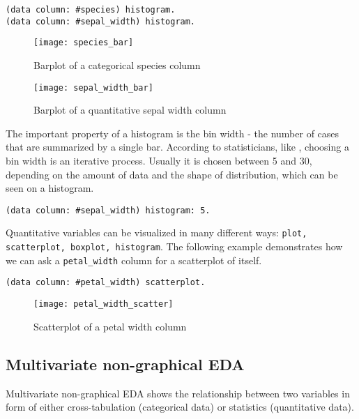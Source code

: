 \documentclass[sigplan]{acmart}
\begin{document}
\begin{lstlisting}[basicstyle=\small,language=Smalltalk]
(data column: #species) histogram.
(data column: #sepal_width) histogram.
\end{lstlisting}

\begin{figure}[H]
  \begin{center}
  \texttt{[image: species\_bar]}
  \caption{Barplot of a categorical species column}
  \end{center}
  \begin{center}
  \texttt{[image: sepal\_width\_bar]}
  \caption{Barplot of a quantitative sepal width column}
  \end{center}
\end{figure}

The important property of a histogram is the bin width - the number of cases that are summarized by a single bar. According to statisticians, like \cite{Seltman}, choosing a bin width is an iterative process. Usually it is chosen between 5 and 30, depending on the amount of data and the shape of distribution, which can be seen on a histogram.

\begin{lstlisting}[basicstyle=\small,language=Smalltalk]
(data column: #sepal_width) histogram: 5.
\end{lstlisting}

Quantitative variables can be visualized in many different ways: \texttt{plot, scatterplot, boxplot, histogram}. The following example demonstrates how we can ask a \texttt{petal\_width} column for a scatterplot of itself.
 
\begin{lstlisting}[basicstyle=\small,language=Smalltalk]
(data column: #petal_width) scatterplot.
\end{lstlisting}
\begin{figure}[H]
  \begin{center}
  \texttt{[image: petal\_width\_scatter]}
  \caption{Scatterplot of a petal width column}
  \end{center}
\end{figure}

\subsection{Multivariate non-graphical EDA}
\label{sec:multi-non}

Multivariate non-graphical EDA shows the relationship between two variables in form of either cross-tabulation (categorical data) or statistics (quantitative data).
\end{document}

